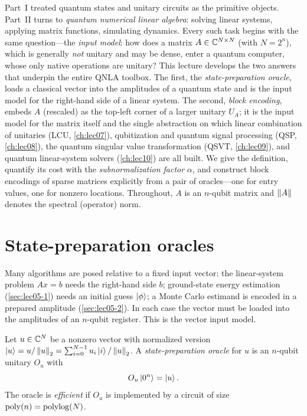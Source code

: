 Part~I treated quantum states and unitary circuits as the primitive objects.
Part~II turns to \emph{quantum numerical linear algebra}: solving linear systems,
applying matrix functions, simulating dynamics. Every such task begins with the
same question---the \emph{input model}: how does a matrix $A\in\mathbb{C}^{N\times N}$
(with $N=2^n$), which is generally \emph{not} unitary and may be dense, enter a
quantum computer, whose only native operations are unitary? This lecture develops
the two answers that underpin the entire QNLA toolbox. The first, the
\emph{state-preparation oracle}, loads a classical vector into the amplitudes of a
quantum state and is the input model for the right-hand side of a linear system.
The second, \emph{block encoding}, embeds $A$ (rescaled) as the top-left corner of
a larger unitary $U_A$; it is the input model for the matrix itself and the single
abstraction on which linear combination of unitaries (LCU, \cref{ch:lec07}),
qubitization and quantum signal processing (QSP, \cref{ch:lec08}), the quantum
singular value transformation (QSVT, \cref{ch:lec09}), and quantum linear-system
solvers (\cref{ch:lec10}) are all built. We give the definition, quantify its cost
with the \emph{subnormalization factor} $\alpha$, and construct block encodings of
sparse matrices explicitly from a pair of oracles---one for entry values, one for
nonzero locations. Throughout, $A$ is an $n$-qubit matrix and
$\left\lVert A \right\rVert$ denotes the spectral (operator) norm.

\section{State-preparation oracles}
\label{sec:lec06-1}

Many algorithms are posed relative to a fixed input vector: the linear-system
problem $Ax=b$ needs the right-hand side $b$; ground-state energy estimation
(\cref{sec:lec05-1}) needs an initial guess $\ket{\phi}$; a Monte Carlo estimand is
encoded in a prepared amplitude (\cref{sec:lec05-2}). In each case the vector must
be loaded into the amplitudes of an $n$-qubit register. This is the vector input
model.

\begin{definition}
\label{def:lec06-sp}
Let $u\in\mathbb{C}^{N}$ be a nonzero vector with normalized version
$\ket{u}=u/\left\lVert u \right\rVert_2=\sum_{i=0}^{N-1}u_i\ket{i}/\left\lVert u \right\rVert_2$. A
\emph{state-preparation oracle} for $u$ is an $n$-qubit unitary $O_u$ with
\begin{equation}
  O_u\ket{0^n}=\ket{u}.
  \label{eq:lec06-sp}
\end{equation}
The oracle is \emph{efficient} if $O_u$ is implemented by a circuit of size
$\operatorname{poly}(n)=\operatorname{polylog}(N)$.
\end{definition}

